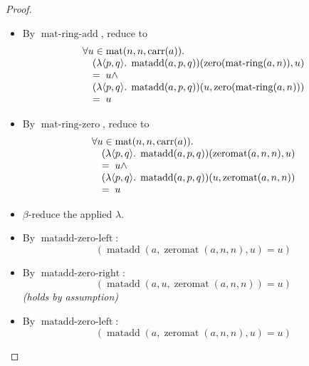 \documentclass[11pt]{article}
\theoremstyle{plain}
\begin{document}
\begin{proof}
\begin{itemize}[leftmargin=2.8em, itemsep=4pt, parsep=1pt]
  \item[\textbf{63}] By $\operatorname{mat\text{-}ring\text{-}add}$, reduce to
\begin{equation*}
\begin{array}{@{}l@{}} \forall u \in \operatorname{mat}(n, n, \operatorname{carr}(a)). \\ \quad (\lambda \langle p, q \rangle.\; \operatorname{matadd}(a, p, q))(\operatorname{zero}(\operatorname{mat\text{-}ring}(a, n)), u) \\ \quad =\; u \wedge \\ \quad (\lambda \langle p, q \rangle.\; \operatorname{matadd}(a, p, q))(u, \operatorname{zero}(\operatorname{mat\text{-}ring}(a, n))) \\ \quad =\; u \end{array}
\end{equation*}

  \item[\textbf{64}] By $\operatorname{mat\text{-}ring\text{-}zero}$, reduce to
\begin{equation*}
\begin{array}{@{}l@{}} \forall u \in \operatorname{mat}(n, n, \operatorname{carr}(a)). \\ \quad (\lambda \langle p, q \rangle.\; \operatorname{matadd}(a, p, q))(\operatorname{zeromat}(a, n, n), u) \\ \quad =\; u \wedge \\ \quad (\lambda \langle p, q \rangle.\; \operatorname{matadd}(a, p, q))(u, \operatorname{zeromat}(a, n, n)) \\ \quad =\; u \end{array}
\end{equation*}

  \item[\textbf{65}] $\beta$-reduce the applied $\lambda$.
  \item[\textbf{66--68}] By $\operatorname{matadd\text{-}zero\text{-}left}$:
\begin{equation*}
(\operatorname{matadd}(a, \operatorname{zeromat}(a, n, n), u) = u)
\end{equation*}

  \item[\textbf{69--70}] By $\operatorname{matadd\text{-}zero\text{-}right}$:
\begin{equation*}
(\operatorname{matadd}(a, u, \operatorname{zeromat}(a, n, n)) = u)
\end{equation*}
  \emph{(holds by assumption)}
  \item[\textbf{71}] By $\operatorname{matadd\text{-}zero\text{-}left}$:
\begin{equation*}
(\operatorname{matadd}(a, \operatorname{zeromat}(a, n, n), u) = u)
\end{equation*}


\end{itemize}
\end{proof}
\end{document}
